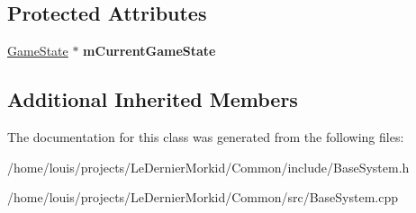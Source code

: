 \subsection*{Protected Attributes}
\begin{DoxyCompactItemize}
\item 
\mbox{\label{class_common_1_1_base_system_a3095d1d1ab984296739697daa2af3393}} 
\hyperlink{class_common_1_1_game_state}{Game\+State} $\ast$ {\bfseries m\+Current\+Game\+State}
\end{DoxyCompactItemize}
\subsection*{Additional Inherited Members}


The documentation for this class was generated from the following files\+:\begin{DoxyCompactItemize}
\item 
/home/louis/projects/\+Le\+Dernier\+Morkid/\+Common/include/Base\+System.\+h\item 
/home/louis/projects/\+Le\+Dernier\+Morkid/\+Common/src/Base\+System.\+cpp\end{DoxyCompactItemize}
